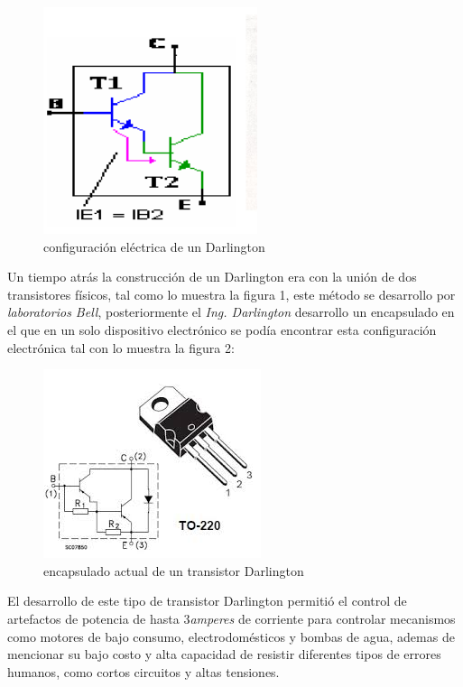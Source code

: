 \documentclass[11pt,a4paper]{article}
\begin{document}
\begin{figure}[hbtp]
\begin{center}
\includegraphics[scale=0.5]{1.png}
\caption{configuración eléctrica de un Darlington}
\end{center}
\end{figure}

Un tiempo atrás la construcción de un Darlington era con la unión de dos transistores físicos, tal como lo muestra la figura 1, este método se desarrollo por \emph{laboratorios Bell}, posteriormente el \emph{Ing. Darlington} desarrollo un encapsulado en el que en un solo dispositivo electrónico se podía encontrar esta configuración electrónica tal con lo muestra la figura 2:

\begin{figure}[h]
\begin{center}
\includegraphics[scale=0.5]{2.png}
\caption{encapsulado actual de un transistor Darlington}
\end{center}
\end{figure}

El desarrollo de este tipo de transistor Darlington permitió el control de artefactos de potencia de hasta 3\emph{amperes} de corriente para controlar mecanismos como motores de bajo consumo, electrodomésticos y bombas de agua, ademas de mencionar su bajo costo y alta capacidad de resistir diferentes tipos de errores humanos, como cortos circuitos y altas tensiones.
\end{document}
